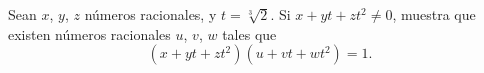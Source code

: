 Sean $x$, $y$, $z$ números racionales, y $t=\sqrt[3]{2}$. Si $x+yt+zt^2\neq 0$, muestra que existen números racionales $u$, $v$, $w$ tales que 
\[\left(x+yt+zt^2\right)\left(u+vt+wt^2\right)=1.\]